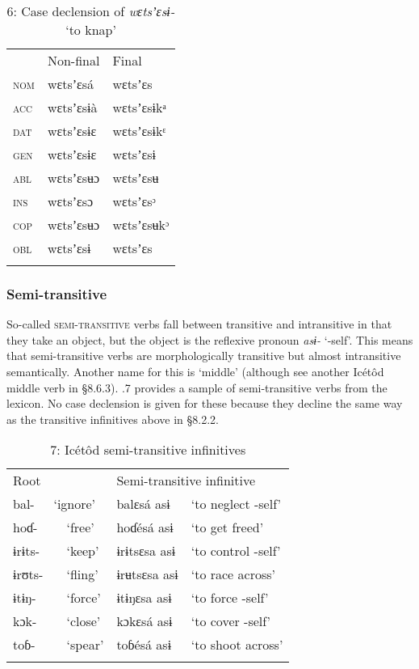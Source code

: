 \begin{table}
\caption{6: Case declension of \textit{wɛtsʼɛsɨ-} ‘to knap’}
\label{tab:8}


\begin{tabularx}{\textwidth}{XXX} & Non-final & Final\\
\lsptoprule
\textsc{nom} & wɛtsʼɛsá & wɛtsʼɛs\\
\textsc{acc} & wɛtsʼɛsɨà & wɛtsʼɛsɨkᵃ\\
\textsc{dat} & wɛtsʼɛsɨɛ & wɛtsʼɛsɨkᵋ\\
\textsc{gen} & wɛtsʼɛsɨɛ & wɛtsʼɛsɨ\\
\textsc{abl} & wɛtsʼɛsʉɔ & wɛtsʼɛsʉ\\
\textsc{ins} & wɛtsʼɛsɔ & wɛtsʼɛsᵓ\\
\textsc{cop} & wɛtsʼɛsʉɔ & wɛtsʼɛsʉkᵓ\\
\textsc{obl} & wɛtsʼɛsɨ & wɛtsʼɛs\\
\lspbottomrule
\end{tabularx}
\end{table}

\subsubsection{Semi-transitive}

So-called \textsc{semi-transitive} verbs fall between transitive and intransitive in that they take an object, but the object is the reflexive pronoun \textit{asɨ-} ‘-self’. This means that semi-transitive verbs are morphologically transitive but almost intransitive semantically. Another name for this is ‘middle’ (although see another Icétôd middle verb in §8.6.3). .7 provides a sample of semi-transitive verbs from the lexicon. No case declension is given for these because they decline the same way as the transitive infinitives above in §8.2.2.


\begin{table}
\caption{7: Icétôd semi-transitive infinitives}
\label{tab:8}


\begin{tabularx}{\textwidth}{XXXXX}
\lsptoprule

Root & \multicolumn{2}{X}{} & \multicolumn{2}{X}{Semi-transitive infinitive}\\
bal- & \multicolumn{2}{X}{‘ignore’} & balɛsá asɨ & ‘to neglect -self’\\
\multicolumn{2}{X}{hoɗ-} & ‘free’ & hoɗésá asɨ & ‘to get freed’\\
\multicolumn{2}{X}{ɨrɨts-} & ‘keep’ & ɨrɨtsɛsa asɨ & ‘to control -self’\\
\multicolumn{2}{X}{ɨrʊts-} & ‘fling’ & ɨrʉtsɛsa asɨ & ‘to race across’\\
\multicolumn{2}{X}{ɨtɨŋ-} & ‘force’ & ɨtɨŋɛsa asɨ & ‘to force -self’\\
\multicolumn{2}{X}{kɔk-} & ‘close’ & kɔkɛsá asɨ & ‘to cover -self’\\
\multicolumn{2}{X}{toɓ-} & ‘spear’ & toɓésá asɨ & ‘to shoot across’\\
\lspbottomrule
\end{tabularx}
\end{table}



